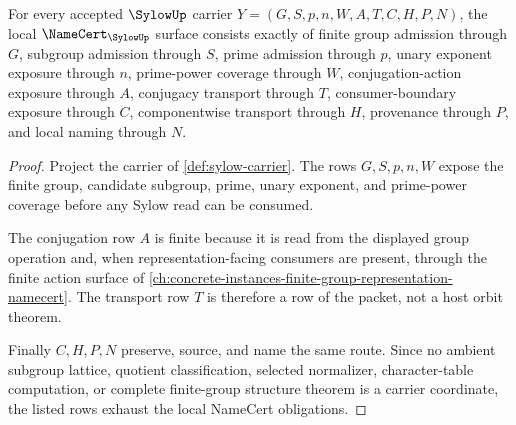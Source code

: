 \begin{theorem}
\label{thm:sylow-namecert-obligations}
For every accepted $\SylowUp$ carrier $Y=(G,S,p,n,W,A,T,C,H,P,N)$, the local $\NameCert_{\SylowUp}$ surface consists exactly of finite group admission through $G$, subgroup admission through $S$, prime admission through $p$, unary exponent exposure through $n$, prime-power coverage through $W$, conjugation-action exposure through $A$, conjugacy transport through $T$, consumer-boundary exposure through $C$, componentwise transport through $H$, provenance through $P$, and local naming through $N$.
\end{theorem}
\begin{proof}
Project the carrier of \autoref{def:sylow-carrier}. The rows $G,S,p,n,W$ expose the finite group, candidate subgroup, prime, unary exponent, and prime-power coverage before any Sylow read can be consumed.

The conjugation row $A$ is finite because it is read from the displayed group operation and, when representation-facing consumers are present, through the finite action surface of \autoref{ch:concrete-instances-finite-group-representation-namecert}. The transport row $T$ is therefore a row of the packet, not a host orbit theorem.

Finally $C,H,P,N$ preserve, source, and name the same route. Since no ambient subgroup lattice, quotient classification, selected normalizer, character-table computation, or complete finite-group structure theorem is a carrier coordinate, the listed rows exhaust the local NameCert obligations.
\end{proof}

